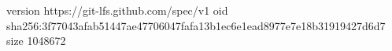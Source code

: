version https://git-lfs.github.com/spec/v1
oid sha256:3f77043afab51447ae47706047fafa13b1ec6e1ead8977e7e18b31919427d6d7
size 1048672

